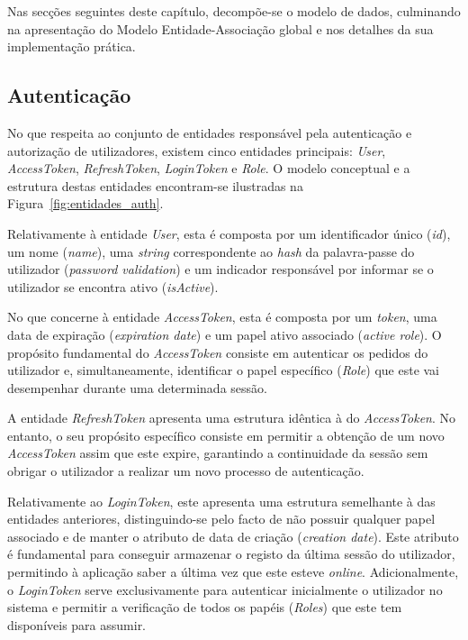 Nas secções seguintes deste capítulo, decompõe-se o modelo de dados, culminando na apresentação do Modelo Entidade-Associação global e nos detalhes da sua implementação prática.



\subsection{Autenticação}

No que respeita ao conjunto de entidades responsável pela autenticação e autorização de utilizadores, existem cinco entidades principais: \textit{User}, \textit{AccessToken}, \textit{RefreshToken}, \textit{LoginToken} e \textit{Role}. O modelo conceptual e a estrutura destas entidades encontram-se ilustradas na Figura~\ref{fig:entidades_auth}.

Relativamente à entidade \textit{User}, esta é composta por um identificador único (\textit{id}), um nome (\textit{name}), uma \textit{string} correspondente ao \textit{hash} da palavra-passe do utilizador (\textit{password validation}) e um indicador responsável por informar se o utilizador se encontra ativo (\textit{isActive}).

No que concerne à entidade \textit{AccessToken}, esta é composta por um \textit{token}, uma data de expiração (\textit{expiration date}) e um papel ativo associado (\textit{active role}). O propósito fundamental do \textit{AccessToken} consiste em autenticar os pedidos do utilizador e, simultaneamente, identificar o papel específico (\textit{Role}) que este vai desempenhar durante uma determinada sessão.

A entidade \textit{RefreshToken} apresenta uma estrutura idêntica à do \textit{AccessToken}. No entanto, o seu propósito específico consiste em permitir a obtenção de um novo \textit{AccessToken} assim que este expire, garantindo a continuidade da sessão sem obrigar o utilizador a realizar um novo processo de autenticação.

Relativamente ao \textit{LoginToken}, este apresenta uma estrutura semelhante à das entidades anteriores, distinguindo-se pelo facto de não possuir qualquer papel associado e de manter o atributo de data de criação (\textit{creation date}). Este atributo é fundamental para conseguir armazenar o registo da última sessão do utilizador, permitindo à aplicação saber a última vez que este esteve \textit{online}. Adicionalmente, o \textit{LoginToken} serve exclusivamente para autenticar inicialmente o utilizador no sistema e permitir a verificação de todos os papéis (\textit{Roles}) que este tem disponíveis para assumir.

